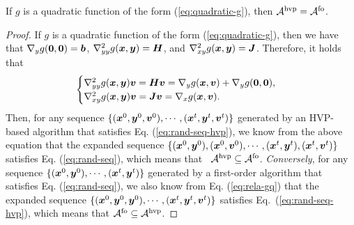 \documentclass{article}
\begin{document}
\begin{lem} \label{lem:zr-grad-hvp}
If $g$ is a quadratic function of the form (\ref{eq:quadratic-g}), then
$  {\mathcal{A}}^{{\rm hvp}} = {\mathcal{A}}^{\rm fo}$.
\end{lem}

\begin{proof} 
If $g$ is a quadratic function of the form (\ref{eq:quadratic-g}), then we have that $\nabla_y g({\bm{0}},{\bm{0}}) = {\bm{b}}$, $\nabla_{yy}^2 g({\bm{x}},{\bm{y}}) =  {\bm{H}}$, and $\nabla_{xy}^2 g({\bm{x}},{\bm{y}}) = {\bm{J}}$. Therefore, 
it holds that
\begin{align} \label{eq:rela-gq}
\begin{split}
\begin{cases}
    \nabla_{yy}^2 g({\bm{x}},{\bm{y}}) {\bm{v}}  = {\bm{H}} {\bm{v}} = \nabla_y g({\bm{x}},{\bm{v}}) + \nabla_y g({\bm{0}},{\bm{0}}), \\
    \nabla_{xy}^2 g({\bm{x}},{\bm{y}}) {\bm{v}} = {\bm{J}} {\bm{v}} = \nabla_x g({\bm{x}},{\bm{v}}). 
\end{cases}    
\end{split}
\end{align}
Then,
for any 
sequence $\{({\bm{x}}^0,{\bm{y}}^0,{\bm{v}}^0),\cdots,({\bm{x}}^t,{\bm{y}}^t,{\bm{v}}^t) \}$ generated by an
HVP-based algorithm that satisfies Eq. (\ref{eq:rand-seq-hvp}), we know from the above equation that the expanded sequence $\{ ({\bm{x}}^0,{\bm{y}}^0), ({\bm{x}}^0,{\bm{v}}^0),\cdots, ({\bm{x}}^t,{\bm{y}}^t), ({\bm{x}}^t,{\bm{v}}^t)  \}$ satisfies Eq. (\ref{eq:rand-seq}), which means that ~${\mathcal{A}}^{\rm hvp} \subseteq {\mathcal{A}}^{\rm fo} $.
\textit{Conversely}, for any sequence $\{  ({\bm{x}}^0,{\bm{y}}^0), \cdots, ({\bm{x}}^t,{\bm{y}}^t)\}$ generated by a first-order algorithm that satisfies Eq. (\ref{eq:rand-seq}), we also
know from Eq. (\ref{eq:rela-gq}) that the expanded sequence $\{ ({\bm{x}}^0,{\bm{y}}^0,{\bm{y}}^0), \cdots, ({\bm{x}}^t,{\bm{y}}^t,{\bm{v}}^t) \}$ satisfies Eq.~(\ref{eq:rand-seq-hvp}), which means  that ${\mathcal{A}}^{\rm fo} \subseteq {\mathcal{A}}^{\rm hvp}$.


\end{proof}
\end{document}
